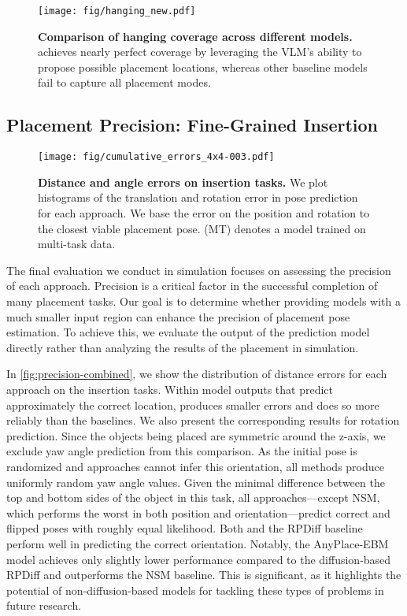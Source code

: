 \begin{figure}[!t]
    \centering
    \texttt{[image: fig/hanging\_new.pdf]}
    \caption{\textbf{Comparison of hanging coverage across different models.} \ourmethod achieves nearly perfect coverage by leveraging the VLM's ability to propose possible placement locations, whereas other baseline models fail to capture all placement modes.
    }
    \label{fig:hanging_coverage}
\end{figure}

\subsection{\textbf{Placement Precision: Fine-Grained Insertion}}


\begin{figure*}[t]
    \centering
    \texttt{[image: fig/cumulative\_errors\_4x4-003.pdf]}
     \caption{
     \textbf{Distance and angle errors on insertion tasks.} We plot histograms of the translation and rotation error in pose prediction for each approach. We base the error on the position and rotation to the closest viable placement pose. (MT) denotes a model trained on multi-task data.}
    \label{fig:precision-combined}
\end{figure*}
The final evaluation we conduct in simulation focuses on assessing the precision of each approach. Precision is a critical factor in the successful completion of many placement tasks. Our goal is to determine whether providing models with a much smaller input region can enhance the precision of placement pose estimation. To achieve this, we evaluate the output of the prediction model directly rather than analyzing the results of the placement in simulation.

In \autoref{fig:precision-combined}, we show the distribution of distance errors for each approach on the insertion tasks. Within model outputs that predict approximately the correct location, \ourmethod produces smaller errors and does so more reliably than the baselines. We also present the corresponding results for rotation prediction.
Since the objects being placed are symmetric around the z-axis, we exclude yaw angle prediction from this comparison. As the initial pose is randomized and approaches cannot infer this orientation, all methods produce uniformly random yaw angle values. Given the minimal difference between the top and bottom sides of the object in this task, all approaches—except NSM, which performs the worst in both position and orientation—predict correct and flipped poses with roughly equal likelihood.
Both \ourmethod and the RPDiff baseline perform well in predicting the correct orientation. Notably, the AnyPlace-EBM model achieves only slightly lower performance compared to the diffusion-based RPDiff and outperforms the NSM baseline. This is significant, as it highlights the potential of non-diffusion-based models for tackling these types of problems in future research.

